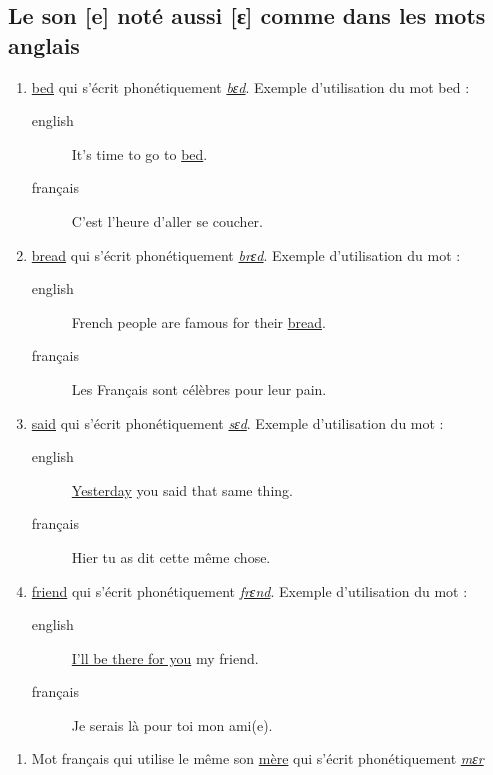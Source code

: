 \documentclass[12pt,a4paper]{book}
\begin{document}
\subsection{Le son [e] noté aussi [ɛ] comme dans les mots anglais}
\label{sec:orgd503395}
\begin{enumerate}
\item \href{http://www.wordreference.com/enfr/bed}{bed} qui s'écrit phonétiquement \href{https://en.oxforddictionaries.com/definition/bed}{\emph{bɛd}}. Exemple d'utilisation du mot bed :
\begin{description}
\item[{english}] \textenglish{It's time to go to \href{https://youtu.be/urARKkLo6MY}{bed}.}
\item[{français}] C'est l'heure d'aller se coucher.
\end{description}
\item \href{http://www.wordreference.com/enfr/bread}{bread} qui s'écrit phonétiquement \href{https://en.oxforddictionaries.com/definition/bread}{\emph{brɛd}}. Exemple d'utilisation du
mot :
\begin{description}
\item[{english}] \textenglish{French people are famous for their \href{https://youtu.be/Ynm9Wrznz4I}{bread}.}
\item[{français}] Les Français sont célèbres pour leur pain.
\end{description}
\item \href{http://www.wordreference.com/enfr/said}{said} qui s'écrit phonétiquement \href{https://en.oxforddictionaries.com/definition/said}{\emph{sɛd}}. Exemple d'utilisation du mot :
\begin{description}
\item[{english}] \textenglish{\href{https://www.azlyrics.com/lyrics/beatles/yesterday.html}{Yesterday} you said that same thing.}
\item[{français}] Hier tu as dit cette même chose.
\end{description}
\item \href{http://www.wordreference.com/enfr/friend}{friend} qui s'écrit phonétiquement \href{https://en.oxforddictionaries.com/definition/friend}{\emph{frɛnd}}. Exemple d'utilisation du mot :
\begin{description}
\item[{english}] \textenglish{\href{https://youtu.be/q-9kPks0IfE}{I'll be there for you} my friend.}
\item[{français}] Je serais là pour toi mon ami(e).
\end{description}
\end{enumerate}
\begin{enumerate}
\item Mot français qui utilise le même son
\label{sec:org74483b7}
\href{http://www.wordreference.com/fren/m\%25C3\%25A8re}{mère} qui s'écrit phonétiquement \href{http://www.larousse.fr/dictionnaires/francais-anglais/m\%25c3\%25a8re/50499}{\emph{mεr}}
\end{enumerate}
\end{document}
